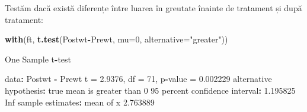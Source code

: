 \documentclass[]{article}
\newenvironment{Shaded}{\begin{snugshade}}{\end{snugshade}}
\newcommand{\KeywordTok}[1]{\textcolor[rgb]{0.13,0.29,0.53}{\textbf{#1}}}
\newcommand{\DataTypeTok}[1]{\textcolor[rgb]{0.13,0.29,0.53}{#1}}
\newcommand{\DecValTok}[1]{\textcolor[rgb]{0.00,0.00,0.81}{#1}}
\newcommand{\FloatTok}[1]{\textcolor[rgb]{0.00,0.00,0.81}{#1}}
\newcommand{\StringTok}[1]{\textcolor[rgb]{0.31,0.60,0.02}{#1}}
\newcommand{\CommentTok}[1]{\textcolor[rgb]{0.56,0.35,0.01}{\textit{#1}}}
\newcommand{\OtherTok}[1]{\textcolor[rgb]{0.56,0.35,0.01}{#1}}
\newcommand{\OperatorTok}[1]{\textcolor[rgb]{0.81,0.36,0.00}{\textbf{#1}}}
\newcommand{\ErrorTok}[1]{\textcolor[rgb]{0.64,0.00,0.00}{\textbf{#1}}}
\newcommand{\NormalTok}[1]{#1}
\begin{document}
\begin{Shaded}
\end{Shaded}

Testăm dacă există diferențe între luarea în greutate înainte de
tratament și după tratament:

\begin{Shaded}
\begin{Highlighting}[]
\KeywordTok{with}\NormalTok{(ft, }\KeywordTok{t.test}\NormalTok{(Postwt}\OperatorTok{-}\NormalTok{Prewt, }\DataTypeTok{mu=}\DecValTok{0}\NormalTok{, }\DataTypeTok{alternative=}\StringTok{"greater"}\NormalTok{))}

\NormalTok{    One Sample t}\OperatorTok{-}\NormalTok{test}

\NormalTok{data}\OperatorTok{:}\StringTok{  }\NormalTok{Postwt }\OperatorTok{-}\StringTok{ }\NormalTok{Prewt}
\NormalTok{t =}\StringTok{ }\FloatTok{2.9376}\NormalTok{, df =}\StringTok{ }\DecValTok{71}\NormalTok{, p}\OperatorTok{-}\NormalTok{value =}\StringTok{ }\FloatTok{0.002229}
\NormalTok{alternative hypothesis}\OperatorTok{:}\StringTok{ }\NormalTok{true mean is greater than }\DecValTok{0}
\DecValTok{95}\NormalTok{ percent confidence interval}\OperatorTok{:}
\StringTok{ }\FloatTok{1.195825}      \OtherTok{Inf}
\NormalTok{sample estimates}\OperatorTok{:}
\NormalTok{mean of x }
 \FloatTok{2.763889} 
\end{Highlighting}
\end{Shaded}
\end{document}
